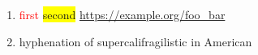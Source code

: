 \documentclass[11pt,a4paper]{article}
\begin{document}
\begin{enumerate}[label=(\alph*),leftmargin=*]
\item \textcolor{red}{first} \colorbox{yellow}{second} \url{https://example.org/foo_bar}
\item hyphenation of supercalifragilistic in American
\end{enumerate}
\end{document}
